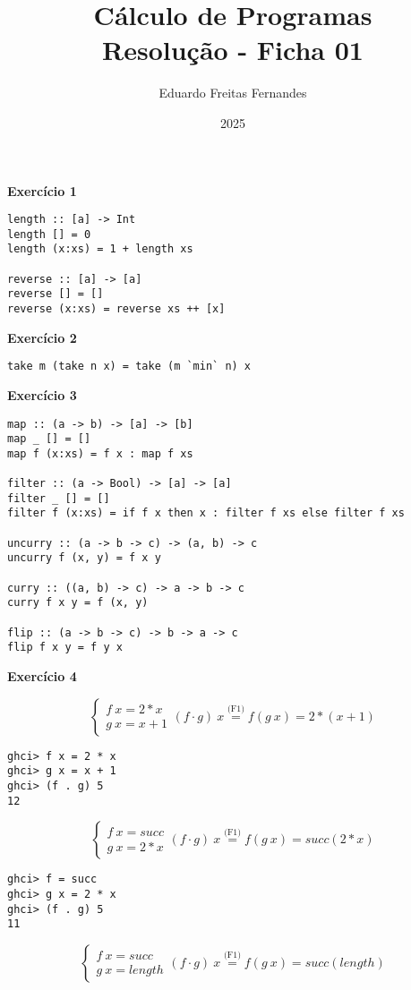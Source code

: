 \documentclass[a4paper,11pt]{article}
\title{Cálculo de Programas \\ Resolução - Ficha 01}
\author{Eduardo Freitas Fernandes}
\date{2025}
\begin{document}
	
\maketitle
	
\noindent \textbf{Exercício 1}
	
\begin{verbatim}
length :: [a] -> Int
length [] = 0
length (x:xs) = 1 + length xs

reverse :: [a] -> [a]
reverse [] = []
reverse (x:xs) = reverse xs ++ [x]
\end{verbatim}

\noindent \textbf{Exercício 2}

\begin{verbatim}
take m (take n x) = take (m `min` n) x
\end{verbatim}

\noindent \textbf{Exercício 3}

\begin{verbatim}
map :: (a -> b) -> [a] -> [b]
map _ [] = []
map f (x:xs) = f x : map f xs

filter :: (a -> Bool) -> [a] -> [a]
filter _ [] = []
filter f (x:xs) = if f x then x : filter f xs else filter f xs

uncurry :: (a -> b -> c) -> (a, b) -> c
uncurry f (x, y) = f x y

curry :: ((a, b) -> c) -> a -> b -> c
curry f x y = f (x, y)

flip :: (a -> b -> c) -> b -> a -> c
flip f x y = f y x
\end{verbatim}

\newpage

\noindent \textbf{Exercício 4}

\[
\begin{cases}
	f \  x = 2 * x \\
	g \  x = x + 1
\end{cases}
(f \cdot g) \  x \overset{\text{(F1)}}{=} f (g \  x) = 2 * (x + 1)
\]

\begin{verbatim}
ghci> f x = 2 * x
ghci> g x = x + 1
ghci> (f . g) 5
12
\end{verbatim}
\[
\begin{cases}
	f \  x = succ \\
	g \  x = 2 * x
\end{cases}
(f \cdot g) \  x \overset{\text{(F1)}}{=} f (g \  x) = succ(2*x)
\]

\begin{verbatim}
ghci> f = succ
ghci> g x = 2 * x
ghci> (f . g) 5
11
\end{verbatim}
\[
\begin{cases}
	f \  x = succ \\
	g \  x = length
\end{cases}
(f \cdot g) \  x \overset{\text{(F1)}}{=} f (g \  x) = succ(length)
\]
\end{document}
